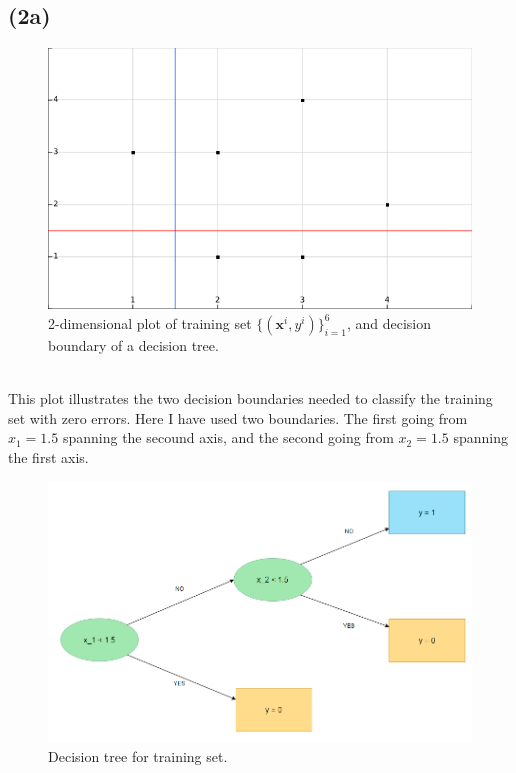 \documentclass[12pt, letterpaper]{article}
\newcommand{\mbf}{\mathbf}
\begin{document}
    \subsection*{(2a)}
      \begin{figure}[H]
        \caption{2-dimensional plot of training set $\{(\mbf{x}^i, y^i)\}_{i=1}^6$, and decision boundary of a decision tree.}
        \centering
        \includegraphics[scale=0.75]{decisionboundary_2a}
      \end{figure}\\
      This plot illustrates the two decision boundaries needed to classify the training set with zero errors. Here I have used two boundaries. The first going from $x_1 = 1.5$ spanning the secound axis, and the second going from $x_2 = 1.5$ spanning the first axis.\\
      \begin{figure}[H]
        \caption{Decision tree for training set.}
        \centering
        \includegraphics[scale=0.6]{DescisionTree}
      \end{figure}\\
\end{document}
